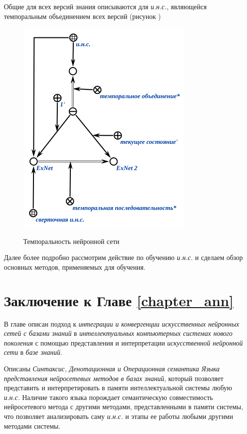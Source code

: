 Общие для всех версий знания описываются для \textit{и.н.с.}, являющейся темпоральным объединением всех версий (рисунок )

\begin{figure}[H]
	\centering
	\caption{Темпоральность нейронной сети}
	\includegraphics[scale=0.8]{author/part3/figures/temporal_neural_network_scg.png}
	\label{fig:temporal_neural_network_scg}
\end{figure}

Далее более подробно рассмотрим действие по обучению \textit{и.н.с.} и сделаем обзор основных методов, применяемых для обучения.

\section*{Заключение к Главе \ref{chapter_ann}}
В главе описан подход к \textit{интеграции и конвергенции искусственных нейронных сетей с базами знаний} в \textit{интеллектуальных компьютерных системах нового поколения} с помощью представления и интерпретации \textit{искусственной нейронной сети} в \textit{базе знаний}.

Описаны \textit{Синтаксис, Денотационная и Операционная семантика Языка представления нейросетевых методов в базах знаний}, который позволяет представить и интерпретировать в памяти интеллектуальной системы любую \textit{и.н.с.} Наличие такого языка порождает семантическую совместимость нейросетевого метода с другими методами, представленными в памяти системы, что позволяет анализировать саму \textit{и.н.с.} и этапы ее работы любыми другими методами системы.

